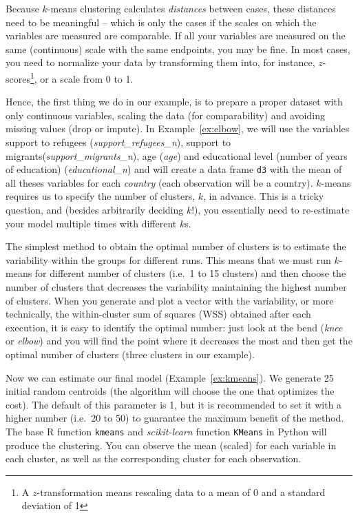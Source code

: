 Because $k$-means clustering calculates \emph{distances} between cases,
these distances need to be meaningful -- which is only the cases if
the scales on which the variables are measured are comparable. If all
your variables are measured on the same (continuous) scale with the
same endpoints, you may be fine. In most cases, you need to normalize
your data by transforming them into, for instance, $z$-scores\footnote{A $z$-transformation means rescaling data to a mean of 0 and a standard deviation of 1}, or a
scale from 0 to 1.

Hence, the first thing we do in our example, is to prepare a proper
dataset with only continuous variables, scaling the data (for
comparability) and avoiding missing values (drop or impute). In
Example~\ref{ex:elbow}, we will use the variables support to refugees
(\emph{support\_refugees\_n}), support to
migrants(\emph{support\_migrants\_n}), age (\emph{age}) and
educational level (number of years of education)
(\emph{educational\_n}) and will create a data frame \verb+d3+ with the
mean of all theses variables for each \emph{country} (each observation
will be a country). $k$-means requires us to specify the number of
clusters, $k$, in advance. This is a tricky question, and (besides 
arbitrarily deciding $k$!), you essentially need to re-estimate your
model multiple times with different $k$s.

The simplest method to obtain the optimal number of clusters is to
estimate the variability within the groups for different runs. This
means that we must run $k$-means for different number of clusters
(i.e.\ 1 to 15 clusters) and then choose the number of clusters that
decreases the variability maintaining the highest number of
clusters. When you generate and plot a vector with the variability,
or more technically, the within-cluster sum of squares (WSS)
obtained after each execution, it is easy to identify the optimal
number: just look at the bend (\textit{knee} or \textit{elbow}) and
you will find the point where it decreases the most and then get the
optimal number of clusters (three clusters in our example).


Now we can estimate our final model (Example~\ref{ex:kmeans}). We generate 25
initial random centroids (the algorithm will choose the one that
optimizes the cost). The default of this parameter is 1, but it is
recommended to set it with a higher number (i.e.\ 20 to 50) to guarantee
the maximum benefit of the method. The base R function \texttt{kmeans} and
\emph{scikit-learn} function \texttt{KMeans} in Python will produce the
clustering. You can observe the mean (scaled) for each variable in
each cluster, as well as the corresponding cluster for each
observation.

